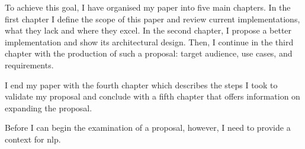 To achieve this goal, I have organised my paper into five main chapters.
In the first chapter I define the scope of this paper and review
current implementations, what they lack and where they excel. In the
second chapter, I propose a better implementation and show
its architectural design. Then, I continue in the third chapter with the
production of such a proposal: target audience, use cases, and requirements.

I end my paper with the fourth chapter which describes the steps I took to
validate my proposal and conclude with a fifth chapter that offers
information on expanding the proposal.

Before I can begin the examination of a proposal, however, I need to
provide a context for \gls{nlp}.

\endgroup

